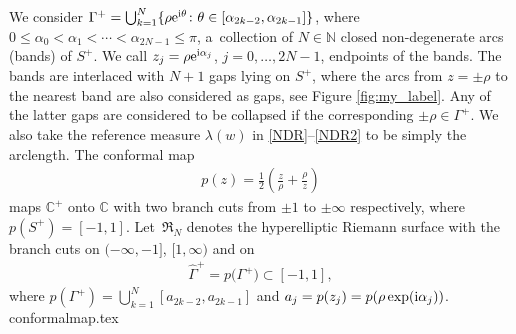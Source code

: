 \documentclass[pdftex]{sigma}
\numberwithin{equation}{section}
\newcommand{\G}{\Gamma}
\def\C{{\mathbb C}}
\def\N{{\mathbb N}}
\def\a{\alpha}
\def\l{\lambda}
\def\hf{\frac{1}{2}}
\def\l{\lambda}
\def\G{\Gamma}
\begin{document}
We consider $\G^+=\bigcup_{k=1}^N\{\rho {\rm e}^{{\rm i}\theta}\colon \theta\in [\alpha_{2k-2},\alpha_{2k-1}]\}$, where $0\leq \a_0 < \a_1<\cdots<\a_{2N-1}{\leq \pi}$,
a~collection
of $N\in \N$ closed non-degenerate arcs (bands) of $S^+$.
We call $z_j=\rho {\rm e}^{{\rm i}\a_j}$, $j=0,\dots,2N-1$, endpoints of the bands. %
The bands are interlaced with $N+1$ gaps lying on $S^+$, where the arcs from $z=\pm\rho$ to the nearest band are also considered as gaps, see Figure \ref{fig:my_label}. Any of the latter gaps are considered to be collapsed if the corresponding $\pm\rho\in\G^+$. We also take the reference measure $\l(w)$ in \eqref{NDR}--\eqref{NDR2} to be simply the arclength. The conformal map
\begin{gather}\label{conf-map-p}
p(z)=\hf\left(\frac z\rho+\frac \rho z\right)
\end{gather}
maps $\C^+$ onto $\C$ with two branch cuts from $\pm 1$ to $\pm\infty $ respectively,
where $p(S^+)=[-1,1]$. Let~$\mathfrak R_N$ denotes the hyperelliptic Riemann surface with the branch cuts on $(-\infty,-1]$, $[1,\infty)$ and on
\begin{gather*}
\hat \G^+=p\bigl(\G^+\bigr)\subset [-1,1],
\end{gather*}
where
$p(\G^+)=\bigcup_{k=1}^N[a_{2k-2},a_{2k-1}]$ and $a_j=p(z_j)=p(\rho\exp({\rm i}\a_j))$.
{conformalmap.tex}
\end{document}
